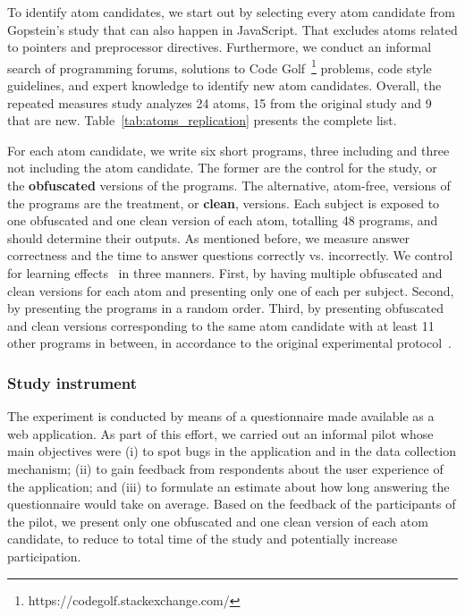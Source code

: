 To identify atom candidates, we start out by selecting every atom candidate from Gopstein's study that can also happen in JavaScript. That excludes atoms related to pointers and preprocessor directives. Furthermore, we conduct an informal search of programming forums, solutions to Code Golf~\footnote{https://codegolf.stackexchange.com/} problems, code style guidelines, and expert knowledge to identify new atom candidates. Overall, the repeated measures study analyzes 24 atoms, 15 from the original study and 9 that are new. Table~\ref{tab:atoms_replication} presents the complete list. 



For each atom candidate, we write six short programs, three including and three not including the atom candidate. The former are the control for the study, or the \textbf{obfuscated} versions of the programs. The alternative, atom-free, versions of the programs are the treatment, or \textbf{clean}, versions. Each subject is exposed to one obfuscated and one clean version of each atom, totalling 48 programs, and should determine their outputs. As mentioned before, we measure answer correctness and the time to answer questions correctly vs. incorrectly. We control for learning effects~\cite{Neely:1991:SPE} in three manners. First, by having multiple obfuscated and clean versions for each atom and presenting only one of each per subject. Second, by presenting the programs in a random order. Third, by presenting obfuscated and clean versions corresponding to the same atom candidate with at least 11 other programs in between, in  accordance to the original experimental protocol~\cite{DBLP:conf/sigsoft/GopsteinIYDZYC17}. 

\subsubsection*{Study instrument} 

The experiment is conducted by means of a questionnaire made available as a web application. As part of this effort, we carried out an informal pilot whose main objectives were (i) to spot bugs in the application and in the data collection mechanism; (ii) to gain feedback from respondents about the user experience of the application; and (iii) to formulate an estimate about how long answering the questionnaire would take on average. Based on the feedback of the participants of the pilot, we present only one obfuscated and one clean version of each atom candidate, to reduce to total time of the study and potentially increase participation.%

